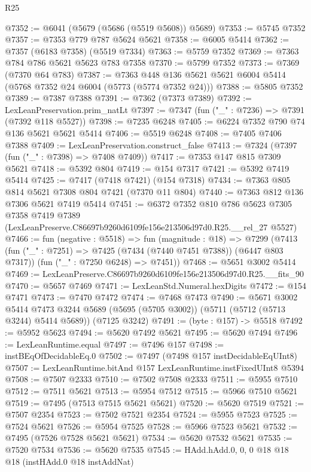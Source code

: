 \begin{lexlean}{R25}
\begin{coremodule}
@7352 := @6041 (@5679 (@5686 (@5519 @5608)) @5689)
@7353 := @5745 @7352
@7357 := @7353 @779 @787 @5624 @5621
@7358 := @6005 @5414
@7362 := @7357 (@6183 @7358) (@5519 @7334)
@7363 := @5759 @7352
@7369 := @7363 @784 @786 @5621 @5623 @783 @7358
@7370 := @5799 @7352
@7373 := @7369 (@7370 @64 @783)
@7387 := @7363 @448 @136 @5621 @5621 @6004 @5414 (@5768 @7352 @24 @6004 (@5773 (@5774 @7352 @24)))
@7388 := @5805 @7352
@7389 := @7387 @7388
@7391 := @7362 (@7373 @7389)
@7392 := LexLeanPreservation.prim_natLt
@7397 := @7347 (fun ("_" : @7236) => @7391 (@7392 @118 @5527))
@7398 := @7235 @6248
@7405 := @6224 @7352 @790 @74 @136 @5621 @5621 @5414
@7406 := @5519 @6248
@7408 := @7405 @7406 @7388
@7409 := LexLeanPreservation.construct_false
@7413 := @7324 (@7397 (fun ("_" : @7398) => @7408 @7409))
@7417 := @7353 @147 @815 @7309 @5621
@7418 := @5392 @804
@7419 := @154 @7317
@7421 := @5392 @7419 @5414
@7425 := @7417 (@7418 @7421) (@154 @7318)
@7434 := @7363 @805 @814 @5621 @7308 @804 @7421 (@7370 @11 @804)
@7440 := @7363 @812 @136 @7306 @5621 @7419 @5414
@7451 := @6372
    @7352
    @810
    @786
    @5623
    @7305
    @7358
    @7419
    @7389
    (LexLeanPreserve.C86697b9260d6109fe156e213506d97d0.R25.__rel_27 @5527)
@7466 := fun (negative : @5518) =>
  fun (magnitude : @18) =>
  @7299
    (@7413
      (fun ("_" : @7251) => @7425 (@7434 (@7440 @7451 @7388)) (@6447 @803 @7317))
      (fun ("_" : @7250 @6248) => @7451))
@7468 := @5651 @3002 @5414
@7469 := LexLeanPreserve.C86697b9260d6109fe156e213506d97d0.R25.__fits_90
@7470 := @5657 @7469
@7471 := LexLeanStd.Numeral.hexDigits
@7472 := @154 @7471
@7473 := @7470 @7472
@7474 := @7468 @7473
@7490 := @5671
    @3002
    @5414
    @7473
    @3244
    @5689
    (@5695 (@5705 @3002))
    (@5711 (@5712 (@5713 @3244) @5414 @5689))
    (@7125 @3242)
@7491 := (byte : @157) -> @5518
@7492 := @5952 @5623
@7494 := @5620 @7492 @5621
@7495 := @5620 @7494
@7496 := LexLeanRuntime.equal
@7497 := @7496 @157
@7498 := instBEqOfDecidableEq.{0}
@7502 := @7497 (@7498 @157 instDecidableEqUInt8)
@7507 := LexLeanRuntime.bitAnd @157 LexLeanRuntime.instFixedUInt8 @5394
@7508 := @7507 @2333
@7510 := @7502 @7508 @2333
@7511 := @5955 @7510
@7512 := @7511 @5621
@7513 := @5954 @7512
@7515 := @5966 @7510 @5621
@7519 := @7495 (@7513 @7515 @5621 @5621)
@7520 := @5620 @7519
@7521 := @7507 @2354
@7523 := @7502 @7521 @2354
@7524 := @5955 @7523
@7525 := @7524 @5621
@7526 := @5954 @7525
@7528 := @5966 @7523 @5621
@7532 := @7495 (@7526 @7528 @5621 @5621)
@7534 := @5620 @7532 @5621
@7535 := @7520 @7534
@7536 := @5620 @7535
@7545 := HAdd.hAdd.{0, 0, 0} @18 @18 @18 (instHAdd.{0} @18 instAddNat)

\end{coremodule}
\end{lexlean}
